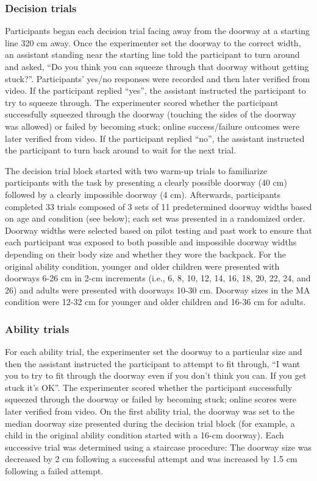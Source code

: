 \documentclass[a4paper,man,natbib,floatsintext,noextraspace]{apa6}
\begin{document}
\subsubsection{Decision trials}

Participants began each decision trial facing away from the doorway at a starting line 320 cm away. Once the experimenter set the doorway to the correct width, an assistant standing near the starting line told the participant to turn around and asked, “Do you think you can squeeze through that doorway without getting stuck?”. Participants’ yes/no responses were recorded and then later verified from video. If the participant replied “yes”, the assistant instructed the participant to try to squeeze through. The experimenter scored whether the participant successfully squeezed through the doorway (touching the sides of the doorway was allowed) or failed by becoming stuck; online success/failure outcomes were later verified from video. If the participant replied “no”, the assistant instructed the participant to turn back around to wait for the next trial.

The decision trial block started with two warm-up trials to familiarize participants with the task by presenting a clearly possible doorway (40 cm) followed by a clearly impossible doorway (4 cm). Afterwards, participants completed 33 trials composed of 3 sets of 11 predetermined doorway widths based on age and condition (see below); each set was presented in a randomized order. Doorway widths were selected based on pilot testing and past work \citep{Recal} to ensure that each participant was exposed to both possible and impossible doorway widths depending on their body size and whether they wore the backpack. For the original ability condition, younger and older children were presented with doorways 6-26 cm in 2-cm increments (i.e., 6, 8, 10, 12, 14, 16, 18, 20, 22, 24, and 26) and adults were presented with doorways 10-30 cm. Doorway sizes in the MA condition were 12-32 cm for younger and older children and 16-36 cm for adults. 

\subsubsection{Ability trials}

For each ability trial, the experimenter set the doorway to a particular size and then the assistant instructed the participant to attempt to fit through, “I want you to try to fit through the doorway even if you don’t think you can. If you get stuck it’s OK”. The experimenter scored whether the participant successfully squeezed through the doorway or failed by becoming stuck; online scores were later verified from video. On the first ability trial, the doorway was set to the median doorway size presented during the decision trial block (for example, a child in the original ability condition started with a 16-cm doorway). Each successive trial was determined using a staircase procedure: The doorway size was decreased by 2 cm following a successful attempt and was increased by 1.5 cm following a failed attempt.
\end{document}
